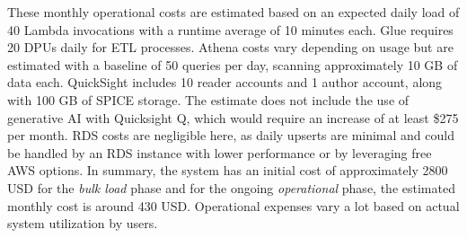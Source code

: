 These monthly operational costs are estimated based on an expected daily load of 40 Lambda invocations with a runtime average of 10 minutes each. Glue requires 20 \ac{DPU}s daily for \ac{ETL} processes. Athena costs vary depending on usage but are estimated with a baseline of 50 queries per day, scanning approximately 10 GB of data each. QuickSight includes 10 reader accounts and 1 author account, along with 100 GB of SPICE storage. The estimate does not include the use of generative AI with Quicksight Q, which would require an increase of at least \$275 per month. \ac{RDS} costs are negligible here, as daily upserts are minimal and could be handled by an \ac{RDS} instance with lower performance or by leveraging free \ac{AWS} options.
In summary, the system has an initial cost of approximately 2800 USD for the \textit{bulk load} phase and for the ongoing \textit{operational} phase, the estimated monthly cost is around 430 USD. Operational expenses vary a lot based on actual system utilization by users.